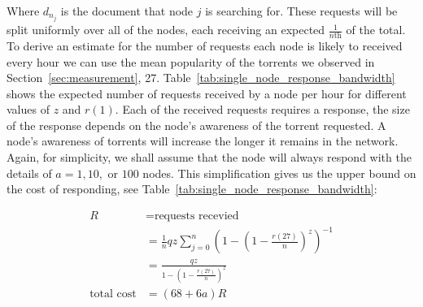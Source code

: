 
    Where $d_{n_j}$ is the document that node $j$ is searching for. These requests will be split uniformly over all of the nodes, each receiving an expected $\tfrac{1}{n\text{th}}$ of the total. To derive an estimate for the number of requests each node is likely to received every hour we can use the mean popularity of the torrents we observed in Section~\ref{sec:measurement}, 27. Table~\ref{tab:single_node_response_bandwidth} shows the expected number of requests received by a node per hour for different values of $z$ and $r(1)$. Each of the received requests requires a response, the size of the response depends on the node's awareness of the torrent requested. A node's awareness of torrents will increase the longer it remains in the network. Again, for simplicity, we shall assume that the node will always respond with the details of $a=1,10,\textrm{ or }100$ nodes. This simplification gives us the upper bound on the cost of responding, see Table~\ref{tab:single_node_response_bandwidth}:

    \begin{align}
                          R &= \textrm{requests recevied} \\
                            &= \frac{1}{n}qz\sum_{j=0}^{n}{(1-(1-\frac{r(27)}{n})^z)^{-1}} \\
                            &= \frac{qz}{1-(1-\frac{r(27)}{n})^z} \\
        \textrm{total cost} &= (68 + 6a)R
    \end{align}

